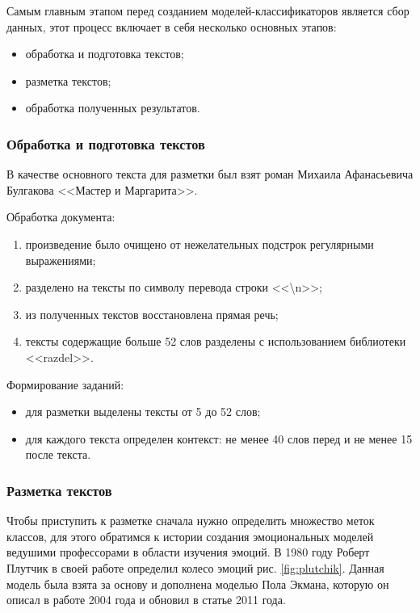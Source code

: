 Самым главным этапом перед созданием моделей-классификаторов является сбор данных, этот процесс включает в себя несколько основных этапов:

\bigskip
\begin{itemize}
 \item обработка и подготовка текстов;
 \item разметка текстов;
 \item обработка полученных результатов.
\end{itemize}

\subsubsection{Обработка и подготовка текстов}

В качестве основного текста для разметки был взят роман Михаила Афанасьевича Булгакова <<Мастер и Маргарита>>.

\bigskip
Обработка документа:

\bigskip
\begin{enumerate}
\item произведение было очищено от нежелательных подстрок регулярными выражениями;
\item разделено на тексты по символу перевода строки <<\textbackslash n>>;
\item из полученных текстов восстановлена прямая речь;
\item тексты содержащие больше 52 слов разделены с использованием библиотеки <<razdel>>.
\end{enumerate}

\bigskip
Формирование заданий:

\bigskip
\begin{itemize}
 \item для разметки выделены тексты от 5 до 52 слов;
 \item для каждого текста определен контекст:  не менее 40 слов перед и не менее 15 после текста.
\end{itemize}



\subsubsection{Разметка текстов}

Чтобы приступить к разметке сначала нужно определить множество меток классов, для этого обратимся к истории создания эмоциональных моделей ведушими профессорами в области изучения эмоций. В 1980 году Роберт Плутчик в своей работе \cite{Plutchik} определил колесо эмоций рис. \ref{fig:plutchik}. Данная модель была взята за основу и дополнена моделью Пола Экмана, которую он описал в работе \cite{Ekman2004} 2004 года и обновил в статье \cite{Ekman2011} 2011 года.

